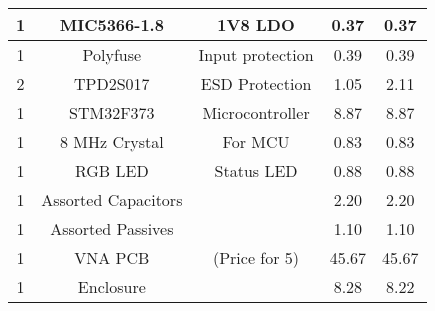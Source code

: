 \begin{table}[H]
\begin{tabular}{|c|c|c|c|c|}
		1                 & MIC5366-1.8                & 1V8 LDO                  & 0.37                                                                  & 0.37                                                                      \\ \hline
		1                 & Polyfuse                   & Input protection   & 0.39                                                                  & 0.39                                                                      \\ \hline
		2                 & TPD2S017                   & ESD Protection           & 1.05                                                                  & 2.11                                                                      \\ \hline
		1                 & STM32F373              & Microcontroller           & 8.87                                                                 & 8.87                                                                      \\ \hline
		1                 & 8 MHz Crystal              & For MCU                  & 0.83                                                                  & 0.83                                                                      \\ \hline
		1                 & RGB LED                    & Status LED               & 0.88                                                                  & 0.88                                                                      \\ \hline
		1                 & Assorted Capacitors        &                          & 2.20                                                                    & 2.20                                                                        \\ \hline
		1                 & Assorted Passives &                          & 1.10                                                                    & 1.10                                                                        \\ \hline
		1                 & VNA PCB                    & (Price for 5)            & 45.67                                                                 & 45.67                                                                     \\ \hline
		1                 & Enclosure                  &                          & 8.28                                                                  & 8.22                                                                      \\ \hline

\end{tabular}
\end{table}
